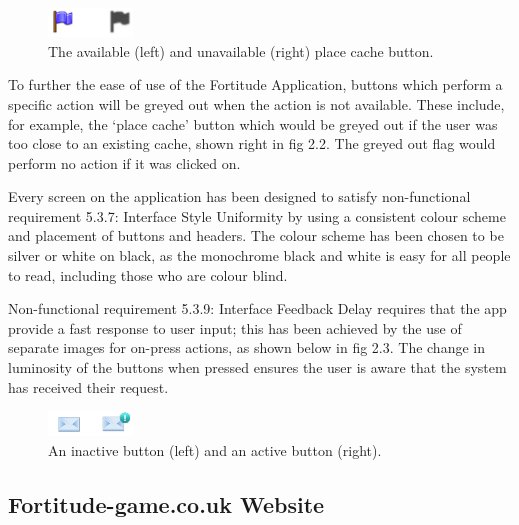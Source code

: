 \begin{figure}
	\vspace{-20pt}
	\begin{center}
	\includegraphics[width=0.2\textwidth]{images/flags_greye}
	\caption{The available (left) and unavailable (right) place cache button.}
	\end{center}
	\vspace{-20pt}
\end{figure}

To further the ease of use of the Fortitude Application, buttons which perform a specific action will be greyed out when the action is not available. These include, for example, the ‘place cache’ button which would be greyed out if the user was too close to an existing cache, shown right in fig 2.2. The greyed out flag would perform no action if it was clicked on.

Every screen on the application has been designed to satisfy non-functional requirement 5.3.7: Interface Style Uniformity by using a consistent colour scheme and placement of buttons and headers. The colour scheme has been chosen to be silver or white on black, as the monochrome black and white is easy for all people to read, including those who are colour blind.

Non-functional requirement 5.3.9: Interface Feedback Delay requires that the app provide a fast response to user input; this has been achieved by the use of separate images for on-press actions, as shown below in fig 2.3. The change in luminosity of the buttons when pressed ensures the user is aware that the system has received their request.

\begin{figure}
	\vspace{-20pt}
	\begin{center}
	\includegraphics[width=0.2\textwidth]{images/news_icons}
	\caption{An inactive button (left) and an active button (right).}
	\end{center}
	\vspace{-10pt}
\end{figure}

\subsection{Fortitude-game.co.uk Website}

